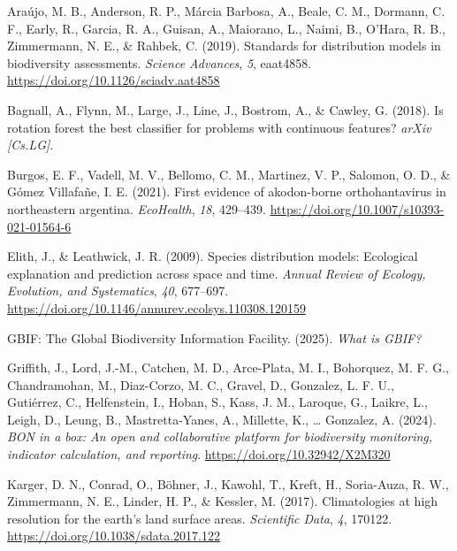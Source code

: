 \documentclass[
]{article}
\newlength{\cslhangindent}
\newenvironment{CSLReferences}[2] %
 {\begin{list}{}{%
  \setlength{\itemindent}{0pt}
  \setlength{\leftmargin}{0pt}
  \setlength{\parsep}{0pt}
  \ifodd #1
   \setlength{\leftmargin}{\cslhangindent}
   \setlength{\itemindent}{-1\cslhangindent}
  \fi
  \setlength{\itemsep}{#2\baselineskip}}}
 {\end{list}}
\begin{document}
\label{refs}
\begin{CSLReferences}{1}{0}
Araújo, M. B., Anderson, R. P., Márcia Barbosa, A., Beale, C. M.,
Dormann, C. F., Early, R., Garcia, R. A., Guisan, A., Maiorano, L.,
Naimi, B., O'Hara, R. B., Zimmermann, N. E., \& Rahbek, C. (2019).
Standards for distribution models in biodiversity assessments.
\emph{Science Advances}, \emph{5}, eaat4858.
\url{https://doi.org/10.1126/sciadv.aat4858}

Bagnall, A., Flynn, M., Large, J., Line, J., Bostrom, A., \& Cawley, G.
(2018). Is rotation forest the best classifier for problems with
continuous features? \emph{arXiv {[}Cs.LG{]}}.

Burgos, E. F., Vadell, M. V., Bellomo, C. M., Martinez, V. P., Salomon,
O. D., \& Gómez Villafañe, I. E. (2021). First evidence of akodon-borne
orthohantavirus in northeastern argentina. \emph{EcoHealth}, \emph{18},
429--439. \url{https://doi.org/10.1007/s10393-021-01564-6}

Elith, J., \& Leathwick, J. R. (2009). Species distribution models:
Ecological explanation and prediction across space and time.
\emph{Annual Review of Ecology, Evolution, and Systematics}, \emph{40},
677--697. \url{https://doi.org/10.1146/annurev.ecolsys.110308.120159}

GBIF: The Global Biodiversity Information Facility. (2025).
\emph{\emph{What is GBIF?}}

Griffith, J., Lord, J.-M., Catchen, M. D., Arce-Plata, M. I., Bohorquez,
M. F. G., Chandramohan, M., Diaz-Corzo, M. C., Gravel, D., Gonzalez, L.
F. U., Gutiérrez, C., Helfenstein, I., Hoban, S., Kass, J. M., Laroque,
G., Laikre, L., Leigh, D., Leung, B., Mastretta-Yanes, A., Millette, K.,
\ldots{} Gonzalez, A. (2024). \emph{{BON} in a box: An open and
collaborative platform for biodiversity monitoring, indicator
calculation, and reporting}. \url{https://doi.org/10.32942/X2M320}

Karger, D. N., Conrad, O., Böhner, J., Kawohl, T., Kreft, H.,
Soria-Auza, R. W., Zimmermann, N. E., Linder, H. P., \& Kessler, M.
(2017). Climatologies at high resolution for the earth's land surface
areas. \emph{Scientific Data}, \emph{4}, 170122.
\url{https://doi.org/10.1038/sdata.2017.122}


\end{CSLReferences}
\end{document}
